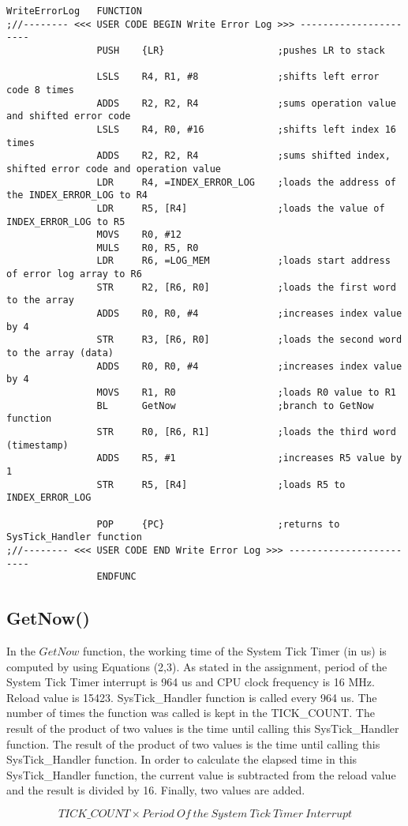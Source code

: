 \documentclass[pdftex,12pt,a4paper]{article}
\begin{document}
\begin{lstlisting}[caption=WriteErrorLog Function, style=customasm]
WriteErrorLog	FUNCTION			
;//-------- <<< USER CODE BEGIN Write Error Log >>> ----------------------		
				PUSH	{LR}					;pushes LR to stack
				
				LSLS	R4, R1, #8				;shifts left error code 8 times
				ADDS	R2, R2, R4				;sums operation value and shifted error code
				LSLS	R4, R0, #16				;shifts left index 16 times
				ADDS	R2, R2, R4				;sums shifted index, shifted error code and operation value
				LDR		R4, =INDEX_ERROR_LOG	;loads the address of the INDEX_ERROR_LOG to R4
				LDR		R5, [R4]				;loads the value of INDEX_ERROR_LOG to R5
				MOVS	R0, #12					
				MULS	R0, R5, R0
				LDR		R6, =LOG_MEM			;loads start address of error log array to R6
				STR		R2, [R6, R0]			;loads the first word to the array
				ADDS	R0, R0, #4				;increases index value by 4
				STR		R3, [R6, R0]			;loads the second word to the array (data)
				ADDS	R0, R0, #4				;increases index value by 4
				MOVS	R1, R0					;loads R0 value to R1
				BL		GetNow					;branch to GetNow function
				STR		R0, [R6, R1]			;loads the third word (timestamp)
				ADDS	R5, #1					;increases R5 value by 1
				STR		R5, [R4]				;loads R5 to INDEX_ERROR_LOG
				
				POP		{PC}					;returns to SysTick_Handler function
;//-------- <<< USER CODE END Write Error Log >>> ------------------------				
				ENDFUNC
\end{lstlisting}

\subsection{GetNow()}

In the $GetNow$ function, the working time of the System Tick Timer (in us) is computed by using Equations (2,3). As stated in the assignment, period of the System Tick Timer interrupt is 964 us and CPU clock frequency is 16 MHz. Reload value is 15423. SysTick\_Handler function is called every 964 us. The number of times the function was called is kept in the TICK\_COUNT. The result of the product of two values is the time until calling this SysTick\_Handler function. The result of the product of two values is the time until calling this SysTick\_Handler function. In order to calculate the elapsed time in this SysTick\_Handler function, the current value is subtracted from the reload value and the result is divided by 16. Finally, two values are added. 

\begin{equation}
    TICK\_COUNT \times Period~Of~the~System~Tick~Timer~Interrupt
\end{equation}
\end{document}
